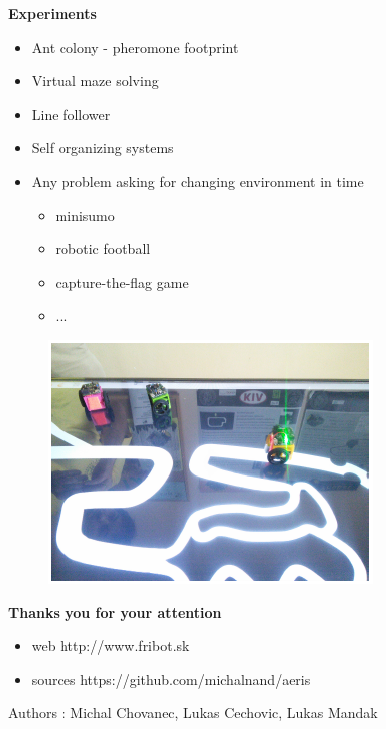 \documentclass[xcolor=dvipsnames]{beamer}
\begin{document}
\begin{frame}{\bf Experiments}

\begin{minipage}{.5\textwidth}

\begin{itemize}
  \item Ant colony - pheromone footprint
  \item Virtual maze solving
  \item Line follower
  \item Self organizing systems
  \item Any problem asking for changing environment in time
    \begin{itemize}
      \item minisumo
      \item robotic football
      \item capture-the-flag game
      \item ...
    \end{itemize}

\end{itemize}

  \end{minipage}%
\begin{minipage}{.5\textwidth}

  \begin{figure}[!htb]
  \centering
  \includegraphics[scale=.5]{../pictures/aeris_photo_01.png}
  \end{figure}

\end{minipage}

\end{frame}




\begin{frame}{\bf Thanks you  for your attention}

\begin{itemize}
  \item web http://www.fribot.sk
  \item sources https://github.com/michalnand/aeris
\end{itemize}

Authors : Michal Chovanec, Lukas Cechovic, Lukas Mandak

\end{frame}
\end{document}
